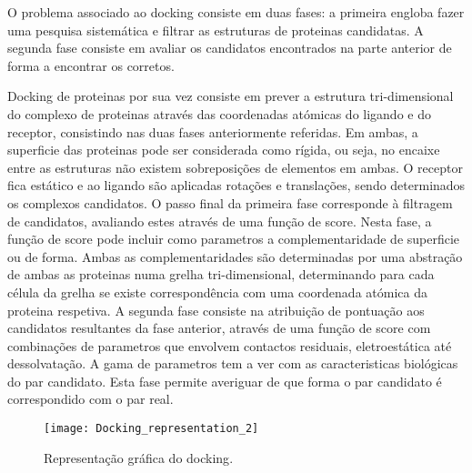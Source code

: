 O problema associado ao docking consiste em duas fases: a primeira engloba fazer uma pesquisa sistemática e filtrar as estruturas de proteinas candidatas. A segunda fase consiste em avaliar os candidatos encontrados na parte anterior de forma a encontrar os corretos\cite{prediction}. \par
 Docking de proteinas por sua vez consiste em prever a estrutura tri-dimensional do complexo de proteinas através das coordenadas atómicas do ligando e do receptor, consistindo nas duas fases anteriormente referidas. Em ambas, a superficie das proteinas pode ser considerada como rígida, ou seja, no encaixe entre as estruturas não existem sobreposições de elementos em ambas. O receptor fica estático e ao ligando são aplicadas rotações e translações, sendo determinados os complexos candidatos. O passo final da primeira fase corresponde à filtragem de candidatos, avaliando estes através de uma função de score. Nesta fase, a função de score pode incluir como parametros a complementaridade de superficie ou de forma. Ambas as complementaridades são determinadas por uma abstração de ambas as proteinas numa grelha tri-dimensional, determinando para cada célula da grelha se existe correspondência com uma coordenada atómica da proteina respetiva. A segunda fase consiste na atribuição de pontuação aos candidatos resultantes da fase anterior, através de uma função de score com combinações de parametros que envolvem contactos residuais, eletroestática até dessolvatação. A gama de parametros tem a ver com as caracteristicas biológicas do par candidato. Esta fase permite averiguar de que forma o par candidato é correspondido com o par real\cite{bigger2016}.
\begin{figure}[ht]
  \centering
    {\texttt{[image: Docking\_representation\_2]}}
  \caption{Representação gráfica do docking\cite{dockingWiki}.}
  \label{dockGraf}
\end{figure}

